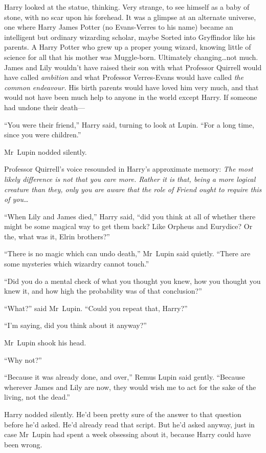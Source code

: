 Harry looked at the statue, thinking. Very strange, to see himself as a baby of stone, with no scar upon his forehead. It was a glimpse at an alternate universe, one where Harry James Potter (no Evans-Verres to his name) became an intelligent but ordinary wizarding scholar, maybe Sorted into Gryffindor like his parents. A Harry Potter who grew up a proper young wizard, knowing little of science for all that his mother was Muggle-born. Ultimately changing…not much. James and Lily wouldn’t have raised their son with what Professor Quirrell would have called \emph{ambition} and what Professor Verres-Evans would have called \emph{the common endeavour.} His birth parents would have loved him very much, and that would not have been much help to anyone in the world except Harry. If someone had undone their death—

“You were their friend,” Harry said, turning to look at Lupin. “For a long time, since you were children.”

Mr~Lupin nodded silently.

Professor Quirrell’s voice resounded in Harry’s approximate memory: \emph{The most likely difference is not that you care more. Rather it is that, being a more logical creature than they, only you are aware that the role of Friend ought to require this of you…}

“When Lily and James died,” Harry said, “did you think at all of whether there might be some magical way to get them back? Like Orpheus and Eurydice? Or the, what was it, Elrin brothers?”

“There is no magic which can undo death,” Mr~Lupin said quietly. “There are some mysteries which wizardry cannot touch.”

“Did you do a mental check of what you thought you knew, how you thought you knew it, and how high the probability was of that conclusion?”

“What?” said Mr~Lupin. “Could you repeat that, Harry?”

“I’m saying, did you think about it anyway?”

Mr~Lupin shook his head.

“Why not?”

“Because it was already done, and over,” Remus Lupin said gently. “Because wherever James and Lily are now, they would wish me to act for the sake of the living, not the dead.”

Harry nodded silently. He’d been pretty sure of the answer to that question before he’d asked. He’d already read that script. But he’d asked anyway, just in case Mr~Lupin had spent a week obsessing about it, because Harry could have been wrong.

